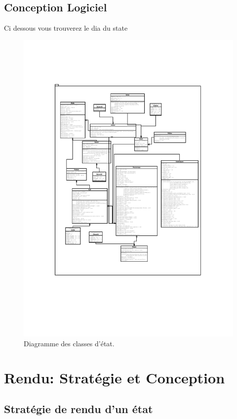 \documentclass[a4paper,12pt]{article}
\begin{document}
\subsection{Conception Logiciel}
Ci dessous vous trouverez le dia du state
\newpage
\begin{landscape}
\begin{figure}[p]
\includegraphics[width=0.6\paperheight,angle=-90]{state.pdf}
\caption{\label{uml:state}Diagramme des classes d'état.}
\end{figure}
\end{landscape}

\clearpage
\section{Rendu: Stratégie et Conception}

\subsection{Stratégie de rendu d'un état}
\end{document}

